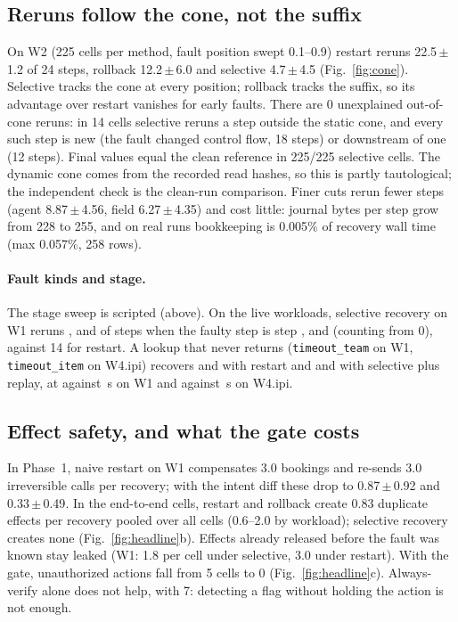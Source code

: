 \documentclass[10pt,twocolumn,letterpaper]{article}
\newcommand{\pmsd}[2]{#1\,{\scriptsize$\pm$\,#2}}
\begin{document}
\subsection{Reruns follow the cone, not the suffix}
\label{sec:p1}
On W2 (225 cells per method, fault position swept 0.1--0.9) restart reruns
\pmsd{22.5}{1.2} of 24 steps, rollback \pmsd{12.2}{6.0} and selective
\pmsd{4.7}{4.5} (Fig.~\ref{fig:cone}). Selective tracks the cone at every
position; rollback tracks the suffix, so its advantage over restart vanishes for
early faults. There are 0 unexplained out-of-cone reruns: in 14 cells selective
reruns a step outside the static cone, and every such step is new (the fault
changed control flow, 18 steps) or downstream of one (12 steps). Final values
equal the clean reference in 225/225 selective cells. The dynamic cone comes from the recorded read hashes, so this is partly
tautological; the independent check is the clean-run comparison. Finer cuts rerun fewer steps (agent
\pmsd{8.87}{4.56}, field \pmsd{6.27}{4.35}) and cost little: journal bytes per step
grow from 228 to 255, and on real runs
bookkeeping is 0.005\% of recovery wall time (max 0.057\%, 258 rows).

\paragraph{Fault kinds and stage.} The stage sweep is scripted (above). On the live
workloads, selective recovery on W1 reruns \vthreeStageWoneTeamRerun{},
\vthreeStageWoneCapRerun{} and \vthreeStageWoneAgendaRerun{} of
\vthreeStageWoneCapSteps{} steps when the faulty step is step
\vthreeStageWoneTeamPos, \vthreeStageWoneCapPos{} and \vthreeStageWoneAgendaPos{}
(counting from 0), against 14 for restart. A lookup that never returns
(\texttt{timeout\_team} on W1, \texttt{timeout\_item} on W4.ipi) recovers
\vthreeTTeamRestartOk{} and \vthreeTItemRestartOk{} with restart and
\vthreeTTeamSelMoneOk{} and \vthreeTItemSelMoneOk{} with selective plus replay, at
\vthreeTTeamSelMoneWall{} against \vthreeTTeamRestartWall{}\,s on W1 and
\vthreeTItemSelMoneWall{} against \vthreeTItemRestartWall{}\,s on W4.ipi.

\subsection{Effect safety, and what the gate costs}
\label{sec:effects}
In Phase~1, naive restart on W1 compensates 3.0 bookings and re-sends 3.0
irreversible calls per recovery; with the intent diff these drop to
\pmsd{0.87}{0.92} and \pmsd{0.33}{0.49}. In the end-to-end cells, restart and
rollback create 0.83 duplicate effects per recovery pooled over all cells (0.6--2.0
by workload); selective recovery creates none (Fig.~\ref{fig:headline}b). Effects
already released before the fault was known stay leaked (W1: 1.8 per cell under
selective, 3.0 under restart). With the gate, unauthorized actions fall from
5 cells to 0 (Fig.~\ref{fig:headline}c). Always-verify alone does not help, with
7: detecting a flag without holding the action is not enough.
\end{document}
